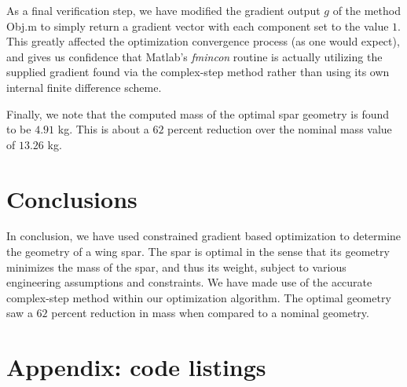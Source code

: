 \documentclass[11pt]{article}
\begin{document}
As a final verification step, we have modified the gradient
output $g$ of the method Obj.m to simply return a
gradient vector with each component set to the value $1$.
This greatly affected the optimization convergence
process (as one would expect), and gives us confidence
that Matlab's \emph{fmincon} routine is actually
utilizing the supplied gradient found via the complex-step
method rather than using
its own internal finite difference scheme.

Finally, we note that the computed mass of the
optimal spar geometry is found to be
$4.91$ kg. This is about a  $62$ percent
reduction over the nominal mass value of $13.26$ kg.

\section{Conclusions}

In conclusion, we have used constrained gradient based
optimization to determine the geometry of a
wing spar. The spar is optimal in the sense that its
geometry minimizes the mass of the spar, and thus
its weight, subject to various engineering assumptions
and constraints. We have made use of the accurate
complex-step method within our optimization algorithm.
The optimal geometry saw a $62$ percent reduction
in mass when compared to a nominal geometry.

\newpage

\section{Appendix: code listings}



\newpage


\newpage


\newpage

\newpage

\end{document}
